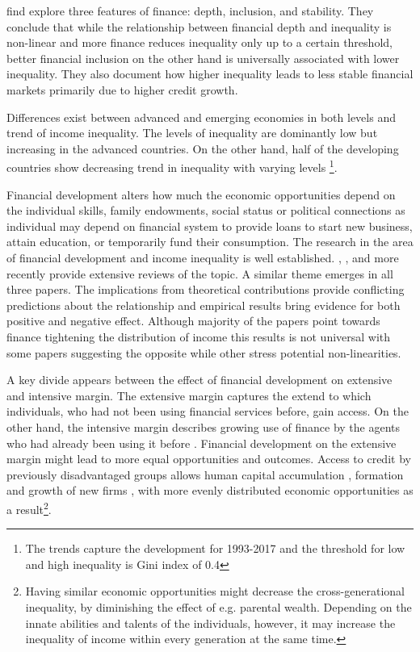 \begin{refsection}
\textcite{cihaksahay2020} find explore three features of finance: depth, inclusion, and stability. They conclude that while the relationship between financial depth and inequality is non-linear and more finance reduces inequality only up to a certain threshold, better financial inclusion on the other hand is universally associated with lower inequality. They also document how higher inequality leads to less stable financial markets primarily due to higher credit growth.

Differences exist between advanced and emerging economies in both levels and trend of income inequality. The levels of inequality are dominantly low but increasing in the advanced countries. On the other hand, half of the developing countries show decreasing trend in inequality with varying levels \parencite{cihaksahay2020}\footnote{The trends capture the development for 1993-2017 and the threshold for low and high inequality is Gini index of 0.4}.

\label{ch4sec:intro}
Financial development alters how much the economic opportunities depend on the individual skills, family endowments, social status or political connections as individual may depend on financial system to provide loans to start new business, attain education, or temporarily fund their consumption. The research in the area of financial development and income inequality is well established. \textcite{demirgucc2009finance}, \textcite{claessens2007finance}, and more recently \cite{de2017finance} provide extensive reviews of the topic. A similar theme emerges in all three papers. The implications from theoretical contributions provide conflicting predictions about the relationship and empirical results bring evidence for both positive and negative effect. Although majority of the papers point towards finance tightening the distribution of income this results is not universal with some papers suggesting the opposite while other stress potential non-linearities.

A key divide appears between the effect of financial development on extensive and intensive margin. The extensive margin captures the extend to which individuals, who had not been using financial services before, gain access. On the other hand, the intensive margin describes growing use of finance by the agents who had already been using it before \parencite{demirgucc2009finance}. Financial development on the extensive margin might lead to more equal opportunities and outcomes. Access to credit by previously disadvantaged groups allows human capital accumulation \parencite{galorzeira1993income, galormoav2004, braunetal2019}, formation and growth of new firms \parencite{evans1989estimated,banerjeenewman1990}, with more evenly distributed economic opportunities as a result\footnote{Having similar economic opportunities might decrease the cross-generational inequality, by diminishing the effect of e.g. parental wealth. Depending on the innate abilities and talents of the individuals, however, it may increase the inequality of income within every generation at the same time.}.


\end{refsection}

